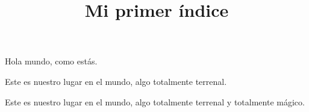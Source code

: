 \documentclass{article}
\title{Mi primer índice}
\begin{document}
\maketitle

Hola mundo, como estás.

\newpage
Este es nuestro lugar en el mundo, algo totalmente terrenal.

\newpage
Este es nuestro lugar en el mundo, algo totalmente terrenal y totalmente mágico.

\printindex
\end{document}
